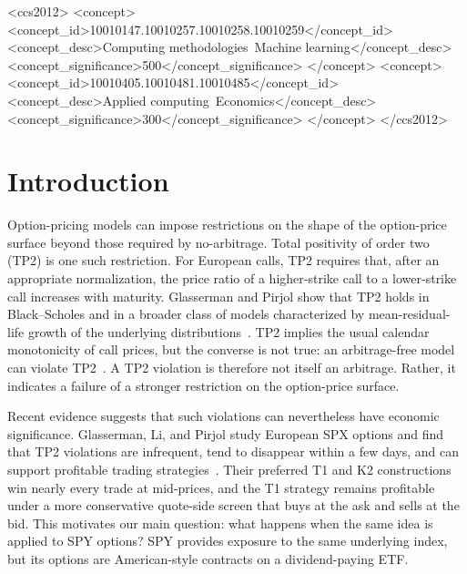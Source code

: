 \documentclass[sigconf,review,anonymous]{acmart}
\begin{document}
\begin{CCSXML}
<ccs2012>
 <concept>
  <concept_id>10010147.10010257.10010258.10010259</concept_id>
  <concept_desc>Computing methodologies~Machine learning</concept_desc>
  <concept_significance>500</concept_significance>
 </concept>
 <concept>
  <concept_id>10010405.10010481.10010485</concept_id>
  <concept_desc>Applied computing~Economics</concept_desc>
  <concept_significance>300</concept_significance>
 </concept>
</ccs2012>
\end{CCSXML}



\maketitle

\section{Introduction}
\label{sec:intro}

Option-pricing models can impose restrictions on the shape of the option-price surface beyond those required by no-arbitrage. Total positivity of order two (TP2) is one such restriction. For European calls, TP2 requires that, after an appropriate normalization, the price ratio of a higher-strike call to a lower-strike call increases with maturity. Glasserman and Pirjol show that TP2 holds in Black--Scholes and in a broader class of models characterized by mean-residual-life growth of the underlying distributions~\cite{glasserman2026tp2theory}. TP2 implies the usual calendar monotonicity of call prices, but the converse is not true: an arbitrage-free model can violate TP2~\cite{glasserman2026tp2theory,glasserman2023convexity}. A TP2 violation is therefore not itself an arbitrage. Rather, it indicates a failure of a stronger restriction on the option-price surface.

Recent evidence suggests that such violations can nevertheless have economic significance. Glasserman, Li, and Pirjol study European SPX options and find that TP2 violations are infrequent, tend to disappear within a few days, and can support profitable trading strategies~\cite{glasserman2025tp2}. Their preferred T1 and K2 constructions win nearly every trade at mid-prices, and the T1 strategy remains profitable under a more conservative quote-side screen that buys at the ask and sells at the bid. This motivates our main question: what happens when the same idea is applied to SPY options? SPY provides exposure to the same underlying index, but its options are American-style contracts on a dividend-paying ETF.
\end{document}
